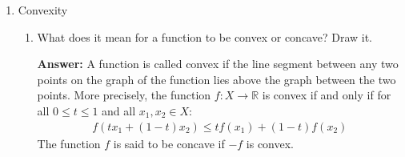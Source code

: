 \documentclass{article}
\newenvironment{QandA}{\begin{enumerate}[label=\arabic*.]}{\end{enumerate}}
\newenvironment{InnerQandA}{\begin{enumerate}[label=\roman*.]}{\end{enumerate}}
\newenvironment{answer}{\par\normalfont \textbf{Answer:}}{}
\newcommand{\R}{\mathbb{R}}
\begin{document}
\begin{QandA}
\begin{InnerQandA}
        \item Give an example of non-differentiable functions that are frequently used in machine learning. How do we do backpropagation if those functions aren’t differentiable?
        \begin{answer}
            Some non-differentiable functions commonly used in Machine Learning: 
            \begin{align*}
                    f(x) &= \vert x \vert \\
                    \text{ReLU}(x) &= \begin{cases}
                    x & \text{if } x \ge 0\\
                    0 & \text{otherwise}
                    \end{cases} \\
                    \text{LeakyReLU}(x) &= \begin{cases}
                    x & \text{if } x \ge 0\\
                    \alpha x & \text{otherwise}
                    \end{cases} \\
            \end{align*}
            Each of these functions are not differentiable at $x=0$. In theory, since any finite set of points is a set of measure $0$, we have $p(x=0)$ and therefore can disregard that these functions are not differentiable. In practice however, due to finite precision it can occur that $x=0$. In these cases we can use a "faux" derivative -- by usually picking the left or the right derivative at the given point.
            
        \end{answer}
        
    \end{InnerQandA}

    \item Convexity
    \begin{InnerQandA}
        \item What does it mean for a function to be convex or concave? Draw it.
        \begin{answer}
            A function is called convex if the line segment between any two points on the graph of the function lies above the graph between the two points. More precisely, the function $f: X \rightarrow \R$ is convex if and only if for all $0 \le t \le 1$ and all $x_1, x_2 \in X$:
            \begin{align*}
                f(t x_1 + (1-t)x_2) \le t f(x_1) + (1-t)f(x_2)
            \end{align*}
        \end{answer}
        The function $f$ is said to be concave if $-f$ is convex.


\end{InnerQandA}
\end{QandA}
\end{document}

